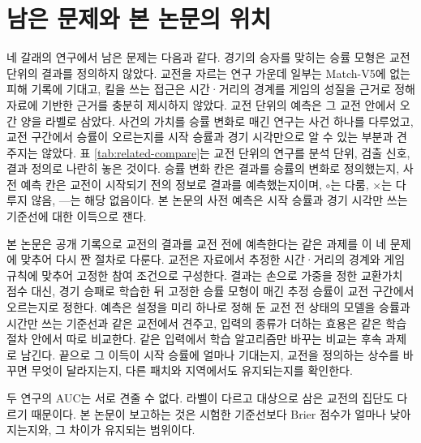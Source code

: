 \section{남은 문제와 본 논문의 위치}
\label{sec:rel-position}

네 갈래의 연구에서 남은 문제는 다음과 같다. 경기의 승자를 맞히는 승률 모형은 교전 단위의 결과를 정의하지 않았다. 교전을 자르는 연구 가운데 일부는 Match-V5에 없는 피해 기록에 기대고, 킬을 쓰는 접근은 시간·거리의 경계를 게임의 성질을 근거로 정해 자료에 기반한 근거를 충분히 제시하지 않았다. 교전 단위의 예측은 그 교전 안에서 오간 양을 라벨로 삼았다. 사건의 가치를 승률 변화로 매긴 연구는 사건 하나를 다루었고, 교전 구간에서 승률이 오르는지를 시작 승률과 경기 시각만으로 알 수 있는 부분과 견주지는 않았다. 표 \ref{tab:related-compare}는 교전 단위의 연구를 분석 단위, 검출 신호, 결과 정의로 나란히 놓은 것이다. 승률 변화 칸은 결과를 승률의 변화로 정의했는지, 사전 예측 칸은 교전이 시작되기 전의 정보로 결과를 예측했는지이며, $\circ$는 다룸, $\times$는 다루지 않음, ---는 해당 없음이다. 본 논문의 사전 예측은 시작 승률과 경기 시각만 쓰는 기준선에 대한 이득으로 잰다.



본 논문은 공개 기록으로 교전의 결과를 교전 전에 예측한다는 같은 과제를 이 네 문제에 맞추어 다시 짠 절차로 다룬다. 교전은 자료에서 추정한 시간·거리의 경계와 게임 규칙에 맞추어 고정한 참여 조건으로 구성한다. 결과는 손으로 가중을 정한 교환가치 점수 대신, 경기 승패로 학습한 뒤 고정한 승률 모형이 매긴 추정 승률이 교전 구간에서 오르는지로 정한다. 예측은 설정을 미리 하나로 정해 둔 교전 전 상태의 모델을 승률과 시간만 쓰는 기준선과 같은 교전에서 견주고, 입력의 종류가 더하는 효용은 같은 학습 절차 안에서 따로 비교한다. 같은 입력에서 학습 알고리즘만 바꾸는 비교는 후속 과제로 남긴다. 끝으로 그 이득이 시작 승률에 얼마나 기대는지, 교전을 정의하는 상수를 바꾸면 무엇이 달라지는지, 다른 패치와 지역에서도 유지되는지를 확인한다.

두 연구의 AUC는 서로 견줄 수 없다. 라벨이 다르고 대상으로 삼은 교전의 집단도 다르기 때문이다. 본 논문이 보고하는 것은 시험한 기준선보다 Brier 점수가 얼마나 낮아지는지와, 그 차이가 유지되는 범위이다.
